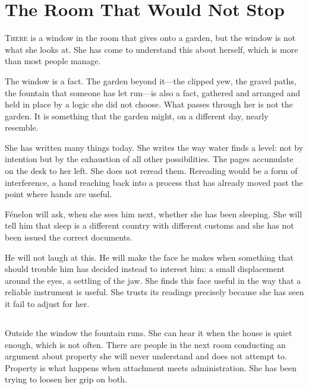 
\chapter{The Room That Would Not Stop}


\lettrine{T}{here} is a window in the room that gives onto a garden, but the window
is not what she looks at. She has come to understand this about
herself, which is more than most people manage.

The window is a fact. The garden beyond it---the clipped yew, the
gravel paths, the fountain that someone has let run---is also a
fact, gathered and arranged and held in place by a logic she did not
choose. What passes through her is not the garden. It is something
that the garden might, on a different day, nearly resemble.

She has written many things today. She writes the way water finds a
level: not by intention but by the exhaustion of all other
possibilities. The pages accumulate on the desk to her left. She
does not reread them. Rereading would be a form of interference, a
hand reaching back into a process that has already moved past the
point where hands are useful.

Fénelon will ask, when she sees him next, whether she has been
sleeping. She will tell him that sleep is a different country with
different customs and she has not been issued the correct
documents.

He will not laugh at this. He will make the face he makes when
something that should trouble him has decided instead to interest
him: a small displacement around the eyes, a settling of the jaw.
She finds this face useful in the way that a reliable instrument
is useful. She trusts its readings precisely because she has seen
it fail to adjust for her.

\section{}

Outside the window the fountain runs. She can hear it when the house
is quiet enough, which is not often. There are people in the next
room conducting an argument about property she will never understand
and does not attempt to. Property is what happens when attachment
meets administration. She has been trying to loosen her grip on
both.

